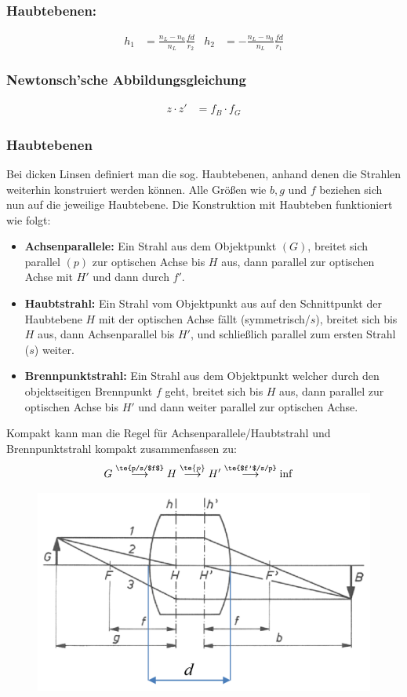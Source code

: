\documentclass[twocolumn, unnumberedsubsub]{summery_5.0} %
\begin{document}
\subsubsection*{Haubtebenen:}
\tight
\begin{align*}
    h_1 &= \frac{n_L - n_0}{n_L} \frac{f d}{r_2} & h_2 &= -\frac{n_L - n_0}{n_L} \frac{f d}{r_1}
\end{align*}\ttight

\subsubsection*{Newtonsch'sche Abbildungsgleichung}\tight
\begin{align*}
    z\cdot z' &= f_B \cdot f_G
\end{align*}\ttight

\subsubsection{Haubtebenen}
Bei dicken Linsen definiert man die sog. Haubtebenen, anhand denen die Strahlen weiterhin konstruiert werden können. Alle Größen wie $b,g$ und $f$ beziehen sich nun auf die jeweilige Haubtebene.
Die Konstruktion mit Haubteben funktioniert wie folgt:
\begin{itemize}
    \item{\bf Achsenparallele:} Ein Strahl aus dem Objektpunkt $(G)$, breitet sich parallel $(p)$ zur optischen Achse bis $H$ aus, dann parallel zur optischen Achse mit $H'$ und dann durch $f'$.
    \item{\bf Haubtstrahl:} Ein Strahl vom Objektpunkt aus auf den Schnittpunkt der Haubtebene $H$ mit der optischen Achse fällt (symmetrisch/$s$), breitet sich bis $H$ aus, dann Achsenparallel bis $H'$, und schließlich parallel zum ersten Strahl ($s$) weiter. 
    \item{\bf Brennpunktstrahl:} Ein Strahl aus dem Objektpunkt welcher durch den objektseitigen Brennpunkt $f$ geht, breitet sich bis $H$ aus, dann parallel zur optischen Achse bis $H'$ und dann weiter parallel zur optischen Achse.
\end{itemize}
Kompakt kann man die Regel für Achsenparallele/Haubtstrahl und Brennpunktstrahl kompakt zusammenfassen zu:
\begin{align*}
    G &\overset{\te{p/s/$f$}}\longrightarrow H\overset{\te{p}}\longrightarrow H' \overset{\te{$f'$/s/p}}\longrightarrow\inf
\end{align*}
\begin{figure}[H]
    \centering
    \includegraphics[width=.49\textwidth]{Haubtebenen.png}
\end{figure}
\end{document}
